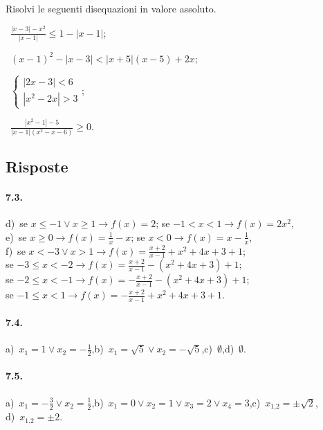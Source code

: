 \begin{esercizio}[\Ast]
 \label{ese:7.36}
Risolvi le seguenti disequazioni in valore assoluto.
\begin{multicols}{2}
 \begin{enumeratea}
 \item~$\frac{\left|x-3\right|-x^2}{\left|x-1\right|}\le 1-\left|x-1\right|$;
 \item~$(x-1)^2-\left|x-3\right|<\left|x+5\right|(x-5)+2x$;
 \item~$\left\{\begin{array}{l}{\left|2x-3\right|<6}\\{\left|x^2-2x\right|>3}\end{array}\right.$;
 \item~$\frac{\left|x^2-1\right|-5}{\left|x-1\right|(x^2-x-6)}\ge 0$.
 \end{enumeratea}
 \end{multicols}
\end{esercizio}

\subsection{Risposte}
\paragraph{7.3.} d)~se $x\le -1\vee x\ge 1\to f(x)=2 $; se $-1<x<1 \to f(x)=2x^2$,\protect\\
\quad e)~se $x\ge 0 \to f(x)=\frac 1 x-x$; se $x<0 \to f(x)=x-\frac 1 x$,\protect\\
\quad f)~se $x<-3\vee x>1 \to f(x)=\frac{x+2}{x-1}+x^2+4x+3+1$;\protect\\ se $-3\le x<-2 \to f(x)=\frac{x+2}{x-1}-(x^2+4x+3)+1$;\protect\\ se $-2\le x<-1\to f(x)=-\frac{x+2}{x-1}-(x^2+4x+3)+1$;\protect\\ se $-1\le x<1\to f(x)=-\frac{x+2}{x-1}+x^2+4x+3+1$.

\paragraph{7.4.} a)~$x_1=1\vee x_2=-\frac 1 2$,\quad b)~$x_1=\sqrt 5\vee x_2=-\sqrt 5$,\quad c)~$\emptyset $,\quad d)~$\emptyset $.

\paragraph{7.5.} a)~$x_1=-\frac 3 2\vee x_2=\frac 1 2$,\quad b)~$x_1=0\vee x_2=1\vee x_3=2\vee x_4=3$,\quad c)~$x_{1\text{,}2}=\pm \sqrt 2$,\protect\\
\quad d)~$x_{1\text{,}2}=\pm 2$.

